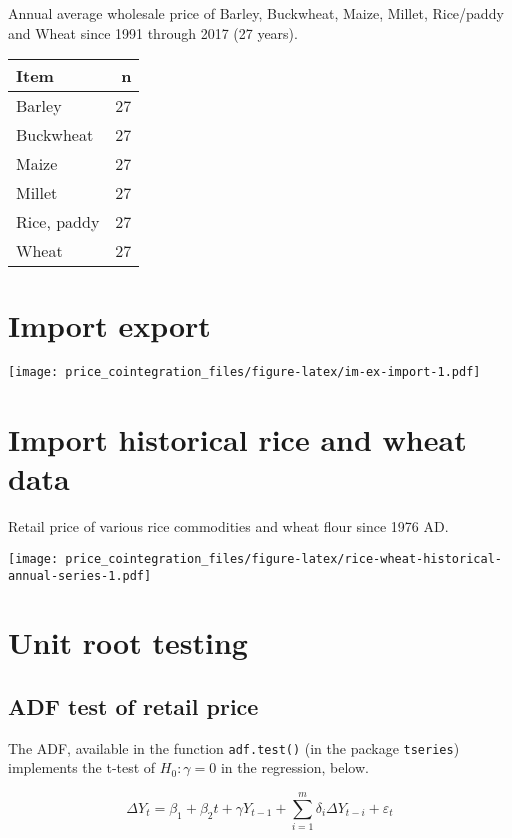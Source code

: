 \documentclass[12pt,]{article}
\begin{document}
Annual average wholesale price of Barley, Buckwheat, Maize, Millet, Rice/paddy and Wheat since 1991 through 2017 (27 years).

\begin{tabular}{lr}
\toprule
Item & n\\
\midrule
Barley & 27\\
Buckwheat & 27\\
Maize & 27\\
Millet & 27\\
Rice, paddy & 27\\
\addlinespace
Wheat & 27\\
\bottomrule
\end{tabular}

\hypertarget{import-export}{%
\section{Import export}\label{import-export}}

\texttt{[image: price\_cointegration\_files/figure-latex/im-ex-import-1.pdf]}

\hypertarget{import-historical-rice-and-wheat-data}{%
\section{Import historical rice and wheat data}\label{import-historical-rice-and-wheat-data}}

Retail price of various rice commodities and wheat flour since 1976 AD.

\texttt{[image: price\_cointegration\_files/figure-latex/rice-wheat-historical-annual-series-1.pdf]}

\hypertarget{unit-root-testing}{%
\section{Unit root testing}\label{unit-root-testing}}

\hypertarget{adf-test-of-retail-price}{%
\subsection{ADF test of retail price}\label{adf-test-of-retail-price}}

The ADF, available in the function \texttt{adf.test()} (in the package \texttt{tseries}) implements the t-test of \(H_0: \gamma = 0\) in the regression, below.

\[
  \Delta {{Y}_{t}}={{\beta
  }_{1}}+{{\beta }_{2}}t+\gamma {{Y}_{t-1}}+ \sum\limits_{i=1}^{m}{\delta_i \Delta
    {{Y}_{t-i}}+{{\varepsilon }_{t}}}
\]
\end{document}
